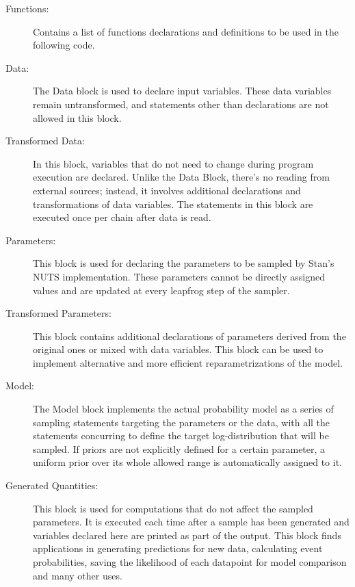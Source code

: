 \begin{description}
\item[Functions:] Contains a list of functions declarations and definitions to be used in the following code.

\item[Data:] The Data block is used to declare input variables. These data variables remain untransformed, and statements other than declarations are not allowed in this block.

\item[Transformed Data:] In this block, variables that do not need to change during program execution are declared. Unlike the Data Block, there's no reading from external sources; instead, it involves additional declarations and transformations of data variables. The statements in this block are executed once per chain after data is read.

\item[Parameters:] This block is used for declaring the parameters to be sampled by Stan’s NUTS implementation. These
  parameters cannot be directly assigned values and are updated at every leapfrog step of the sampler.

\item[Transformed Parameters:] This block contains additional declarations of parameters derived from the original ones
  or mixed with data variables. This block can be used to implement alternative and more efficient reparametrizations of the model.

\item[Model:] The Model block implements the actual probability model as a series of sampling statements targeting the
  parameters or the data, with all the statements concurring to define the target log-distribution that will be sampled. If priors are not explicitly defined for a certain parameter, a uniform  prior over its whole allowed range is automatically assigned to it.

\item[Generated Quantities:]This block is used for computations that do not affect the sampled parameters. It is executed each time after a sample has been generated and variables declared here are printed as part of the output. This block finds applications in generating predictions for new data, calculating event probabilities, saving the likelihood of each datapoint for model comparison and many other uses.

\end{description}

